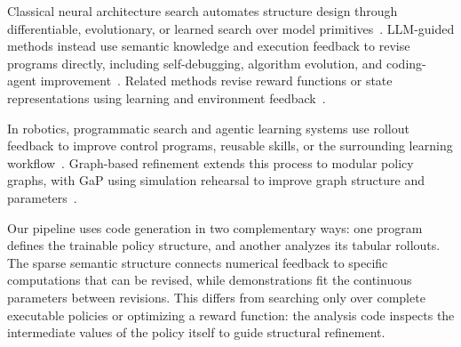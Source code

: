 Classical neural architecture search automates structure design through differentiable, evolutionary, or learned search over model primitives~\citep{liu2018darts,jian2023eenas,zoph2018learning}.
LLM-guided methods instead use semantic knowledge and execution feedback to revise programs directly, including self-debugging, algorithm evolution, and coding-agent improvement~\citep{chen2023selfdebug,novikov2025alphaevolve,zhang2025darwin}.
Related methods revise reward functions or state representations using learning and environment feedback~\citep{ma2023eureka,li2025R,peng2024adaptive}.

In robotics, programmatic search and agentic learning systems use rollout feedback to improve control programs, reusable skills, or the surrounding learning workflow~\citep{hu2025multimodal,lu2026aspire,xiao2026enpire}.
Graph-based refinement extends this process to modular policy graphs, with GaP using simulation rehearsal to improve graph structure and parameters~\citep{chen2026gap}.

Our pipeline uses code generation in two complementary ways: one program defines the trainable policy structure, and another analyzes its tabular rollouts.
The sparse semantic structure connects numerical feedback to specific computations that can be revised, while demonstrations fit the continuous parameters between revisions.
This differs from searching only over complete executable policies or optimizing a reward function: the analysis code inspects the intermediate values of the policy itself to guide structural refinement.
